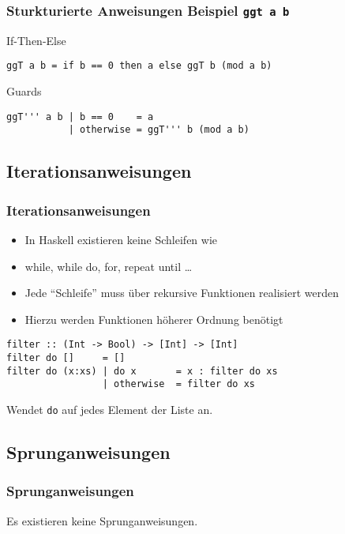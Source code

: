 \begin{frame}[fragile]
\frametitle{Sturkturierte Anweisungen Beispiel \lstinline|ggt a b|}
\begin{block}{If-Then-Else}
\begin{lstlisting}
ggT a b = if b == 0 then a else ggT b (mod a b)
\end{lstlisting}
\end{block}
\begin{block}{Guards}
\begin{lstlisting}
ggT''' a b | b == 0    = a
           | otherwise = ggT''' b (mod a b) 
\end{lstlisting}
\end{block}
\end{frame}

\subsection{Iterationsanweisungen}
\begin{frame}[fragile]
\frametitle{Iterationsanweisungen}
\begin{block}{\vspace*{-3ex}}
\begin{itemize}
  \item In Haskell existieren keine Schleifen wie
  \item while, while do, for, repeat until \ldots
  \item Jede "`Schleife"' muss über rekursive Funktionen realisiert werden
  \item Hierzu werden Funktionen höherer Ordnung benötigt
\end{itemize}
\end{block}
\begin{lstlisting}
filter :: (Int -> Bool) -> [Int] -> [Int]
filter do []     = []
filter do (x:xs) | do x       = x : filter do xs
                 | otherwise  = filter do xs
\end{lstlisting}
\vspace*{-3ex}
\begin{block}{\vspace*{-3ex}}
Wendet \lstinline|do| auf jedes Element der Liste an.
\end{block}
\end{frame}

\subsection{Sprunganweisungen}
\begin{frame}
\frametitle{Sprunganweisungen}
\begin{block}{\vspace*{-3ex}}
Es existieren keine Sprunganweisungen.
\end{block}
\end{frame}
